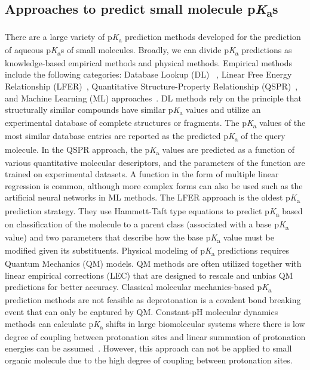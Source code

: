 \documentclass[9pt,lineno,final]{elife}
\newcommand{\pKa}{p\textit{K}\textsubscript{a}}
\begin{document}
\subsection{Approaches to predict small molecule \pKa{}s}

There are a large variety of \pKa{} prediction methods developed for the prediction of aqueous \pKa{}s of small molecules. 
Broadly, we can divide \pKa{} predictions as knowledge-based empirical methods and physical methods. 
Empirical methods include the following categories: Database Lookup (DL) ~\citep{Kogej_Muresan_2005}, Linear Free Energy Relationship (LFER)~\citep{PerrinDDpaPf, Hammett_1940, Taft:1959:J.Am.Chem.Soc.}, Quantitative Structure-Property Relationship (QSPR)~\citep{Xing:2003:J.Chem.Inf.Comput.Sci., Zhang:2006:J.Chem.Inf.Model., Cruciani:2009:Chem.Biodivers., Milletti:2007:J.Chem.Inf.Model.}, and Machine Learning (ML) approaches~\citep{Fraczkiewicz:2013:ReferenceModuleinChemistryMolecularSciencesandChemicalEngineering, simulation-plus-pKa}. 
DL methods rely on the principle that structurally similar compounds have similar \pKa{} values and utilize an experimental database of complete structures or fragments. 
The \pKa{} values of the most similar database entries are reported as the predicted \pKa{} of the query molecule.
In the QSPR approach, the \pKa{} values are predicted as a function of various quantitative molecular descriptors, and the parameters of the function are trained on experimental datasets. 
A function in the form of multiple linear regression is common, although more complex forms can also be used such as the artificial neural networks in ML methods.
The LFER approach is the oldest \pKa{} prediction strategy. 
They use Hammett-Taft type equations to predict \pKa{} based on classification of the molecule to a parent class (associated with a base \pKa{} value) and two parameters that describe how the base \pKa{} value must be modified given its substituents. 
Physical modeling of \pKa{} predictions requires Quantum Mechanics (QM) models. 
QM methods are often utilized together with linear empirical corrections (LEC) that are designed to rescale and unbias QM predictions for better accuracy. 
Classical molecular mechanics-based \pKa{} prediction methods are not feasible as deprotonation is a covalent bond breaking event that can only be captured by QM. 
Constant-pH molecular dynamics methods can calculate \pKa{} shifts in large biomolecular systems where there is low degree of coupling between protonation sites and linear summation of protonation energies can be assumed~\citep{Radak:2017:J.Chem.TheoryComput.}. 
However, this approach can not be applied to small organic molecule due to the high degree of coupling between protonation sites. 
\end{document}
